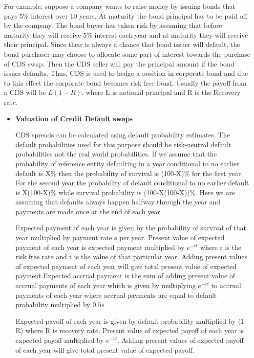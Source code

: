 \documentclass[11pt]{article}
\numberwithin{equation}{section}
\begin{document}
\hspace{1cm} For example, suppose a company wants to raise money by issuing bonds that pays 5\% interest over 10 years. At maturity the bond principal has to be paid off by the company.
The bond buyer has taken risk by assuming that before maturity they will receive 5\% interest each year and at maturity they will receive their principal. Since their is always a chance that bond issuer will default, the bond purchaser may choose to allocate some part of interest towards the purchase of CDS swap. Then the CDS seller will pay the principal amount if the bond issuer defaults. Thus, CDS is used to hedge a position in corporate bond and due to this effect the corporate bond becomes risk free bond. Usually the payoff from a CDS will be $L(1-R)$, where L is notional principal and R is the Recovery rate.
\begin{itemize}
	\item \textbf{Valuation of Credit Default swaps}\label{itm:xyz}
	\medskip
	
	CDS spreads can be calculated using default probability estimates. The default probabilities used for this purpose should be risk-neutral default probabilities not the real world probabilities. If we assume that the probability of reference entity defaulting in a year conditional to no earlier default is X\% then the probability of survival is (100-X)\% for the first year. For the second year the probability of default conditional to no earlier default is X(100-X)\% while survival probability is (100-X(100-X))\%. Here we are assuming that defaults always happen halfway through the year and payments are made once at the end of each year. \medskip
	
	\hspace{1 cm}Expected payment of each year is given by the probability of survival of that year multiplied by payment rate s per year. Present value of expected payment of each year is expected payment multiplied by $e^{-rt}$ where r is the risk free rate and t is the value of that particular year. Adding present values of expected payment of each year will give total present value of expected payment.Expected accrual payment is the sum of adding present value of accrual payments of each year which is given by multiplying $e^{-rt}$ to accrual payments of each year where accrual payments are equal to default probability multiplied by $0.5s$ \medskip
	
	\hspace{1 cm}Expected payoff of each year is given by default probability multiplied by (1-R) where R is recovery rate. Present value of expected payoff of each year is expected payoff multiplied by $e^{-rt}$. Adding present values of expected payoff of each year will give total present value of expected payoff.\medskip
	

\end{itemize}
\end{document}
